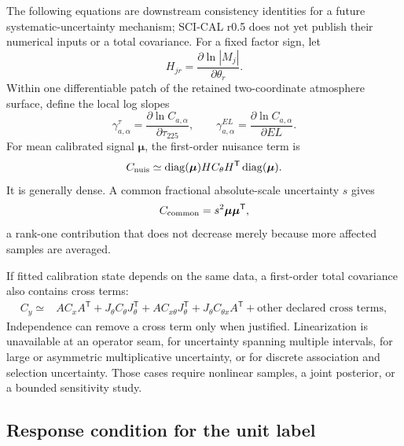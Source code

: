 The following equations are downstream consistency identities for a future
systematic-uncertainty mechanism; SCI-CAL r0.5 does not yet publish their
numerical inputs or a total covariance. For a fixed factor sign, let
\begin{equation}
 H_{jr}=\frac{\partial\ln|M_j|}{\partial\theta_r}.
 \label{eq:nuisance-jacobian}
\end{equation}
Within one differentiable patch of the retained two-coordinate atmosphere
surface, define the local log slopes
\begin{equation}
 \gamma^{\tau}_{a,\alpha}=\frac{\partial\ln C_{a,\alpha}}
 {\partial\tau_{225}},\qquad
 \gamma^{EL}_{a,\alpha}=\frac{\partial\ln C_{a,\alpha}}
 {\partial EL}.
 \label{eq:atmos-derivatives}
\end{equation}
For mean calibrated signal \(\boldsymbol\mu\), the first-order nuisance term is
\begin{equation}
 C_{\rm nuis}\simeq
 \operatorname{diag}(\boldsymbol\mu)H C_\theta H^{\mathsf T}
 \operatorname{diag}(\boldsymbol\mu).
 \label{eq:nuisance-covariance}
\end{equation}
It is generally dense. A common fractional absolute-scale uncertainty \(s\)
gives
\begin{equation}
 C_{\rm common}=s^2\boldsymbol\mu\boldsymbol\mu^{\mathsf T},
 \label{eq:common-rank-one}
\end{equation}
a rank-one contribution that does not decrease merely because more affected
samples are averaged.

If fitted calibration state depends on the same data, a first-order total
covariance also contains cross terms:
\begin{align}
 C_y\simeq{}& A C_x A^{\mathsf T}
 +J_\theta C_\theta J_\theta^{\mathsf T}
 +A C_{x\theta}J_\theta^{\mathsf T}
 +J_\theta C_{\theta x}A^{\mathsf T}
 +\text{other declared cross terms},
 \label{eq:full-covariance}
\end{align}
Independence can remove a cross term only when justified.
Linearization is unavailable at an operator seam, for uncertainty spanning
multiple intervals, for large or asymmetric multiplicative uncertainty, or
for discrete association and selection uncertainty. Those cases require
nonlinear samples, a joint posterior, or a bounded sensitivity study.

\subsection{Response condition for the unit label}
\label{sec:response-equations}

